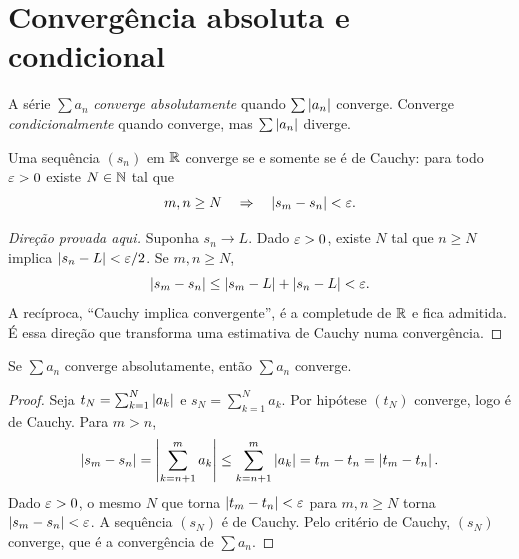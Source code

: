 \documentclass[11pt,a4paper]{article}
\begin{document}

\section{Convergência absoluta e condicional}

\begin{definicao}
A série \(\sum a_n\) \emph{converge absolutamente} quando \(\sum\left\lvert a_n \right\rvert\) converge. Converge \emph{condicionalmente} quando converge, mas \(\sum\left\lvert a_n \right\rvert\) diverge.
\end{definicao}

\begin{teorema}
Uma sequência \((s_n)\) em \(\mathbb{R}\) converge se e somente se é de Cauchy: para todo \(\varepsilon>0\) existe \(N\in\mathbb{N}\) tal que
\[
m,n\ge N\quad\Rightarrow\quad\left\lvert s_m-s_n \right\rvert<\varepsilon.
\]
\end{teorema}

\begin{proof}[Direção provada aqui]
Suponha \(s_n\to L\). Dado \(\varepsilon>0\), existe \(N\) tal que \(n\ge N\) implica \(\left\lvert s_n-L \right\rvert<\varepsilon/2\). Se \(m,n\ge N\),
\[
\left\lvert s_m-s_n \right\rvert\le\left\lvert s_m-L \right\rvert+\left\lvert s_n-L \right\rvert<\varepsilon.
\]
A recíproca, ``Cauchy implica convergente'', é a completude de \(\mathbb{R}\) e fica admitida. É essa direção que transforma uma estimativa de Cauchy numa convergência.
\end{proof}

\begin{teorema}
Se \(\sum a_n\) converge absolutamente, então \(\sum a_n\) converge.
\end{teorema}

\begin{proof}
Seja \(t_N=\sum_{k=1}^N\left\lvert a_k \right\rvert\) e \(s_N=\sum_{k=1}^N a_k\). Por hipótese \((t_N)\) converge, logo é de Cauchy. Para \(m>n\),
\[
\left\lvert s_m-s_n \right\rvert
=\left\lvert \sum_{k=n+1}^{m} a_k \right\rvert
\le\sum_{k=n+1}^{m}\left\lvert a_k \right\rvert
=t_m-t_n
=\left\lvert t_m-t_n \right\rvert.
\]
Dado \(\varepsilon>0\), o mesmo \(N\) que torna \(\left\lvert t_m-t_n \right\rvert<\varepsilon\) para \(m,n\ge N\) torna \(\left\lvert s_m-s_n \right\rvert<\varepsilon\). A sequência \((s_N)\) é de Cauchy. Pelo critério de Cauchy, \((s_N)\) converge, que é a convergência de \(\sum a_n\).
\end{proof}
\end{document}
